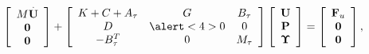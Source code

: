 \begin{frame}
\begin{itemize}
\begin{equation*}
\left[\begin{array}{c}
M\overset{.}{\U}\\
\mathbf{0}\\
\mathbf{0}
\end{array}\right]+\left[\begin{array}{ccc}
K+C+A_\tau&G&B_\tau\\
D&\alert<4>{0}&0\\
-B_\tau^T&0&M_\tau
\end{array}\right]\left[\begin{array}{c}
\U\\
\P\\
\ETA
\end{array}\right]=\left[\begin{array}{c}
\F_u\\
\mathbf{0}\\
\mathbf{0}
\end{array}\right],
\end{equation*}
\end{itemize}
\vspace{-0.2cm}
\end{frame}
